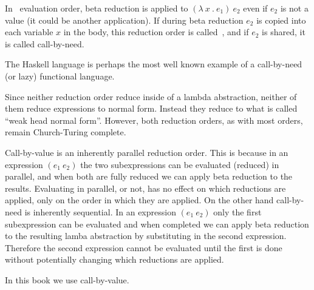 \begin{flex}
\label{grp:def:lambda-calculus::call-by-need}

\begin{definition}
\label{def:lambda-calculus::call-by-need}
In~ evaluation order,
beta reduction is applied to
$(\lambda~x~.~e_1)~e_2$ even if $e_2$ is not a value (it could be another application).
If during beta reduction $e_2$ is copied into each variable $x$ in the
body, this reduction order is called~, and if $e_2$
is shared, it is called call-by-need.  

\end{definition}

\begin{example}
\label{xmpl:lambda-calculus::haskell}
The Haskell language is perhaps the most well known example of a
call-by-need (or lazy) functional language.

\end{example}
\end{flex}

\begin{cluster}
\label{grp:grm:lambda-calculus::neither}

\begin{gram}
\label{grm:lambda-calculus::neither}
  Since neither reduction order reduce inside of a
  lambda abstraction, neither of them reduce expressions to normal form.  Instead they
  reduce to what is called ``weak head normal form''.
  However, both reduction orders, as with most orders, remain Church-Turing complete.

\end{gram}
\end{cluster}

\begin{cluster}
\label{grp:grm:lambda-calculus::call-by-value}

\begin{gram}
\label{grm:lambda-calculus::call-by-value}
Call-by-value is an inherently parallel reduction order.    This is
because in an expression $(e_1~e_2)$ the two subexpressions can be
evaluated (reduced) in parallel, and when both are fully reduced we can apply
beta reduction to the results.    Evaluating in parallel, or not, has no
effect on which reductions are applied, only on the order in which
they are applied.
On the other hand call-by-need is inherently sequential.    In an
expression $(e_1~e_2)$  only the first subexpression can be evaluated and
when completed we can apply beta reduction to the resulting lamba
abstraction by substituting in the second expression.     Therefore
the second expression cannot be evaluated until the first is done
without potentially changing which reductions are applied.

In this book we use call-by-value.

\end{gram}
\end{cluster}

